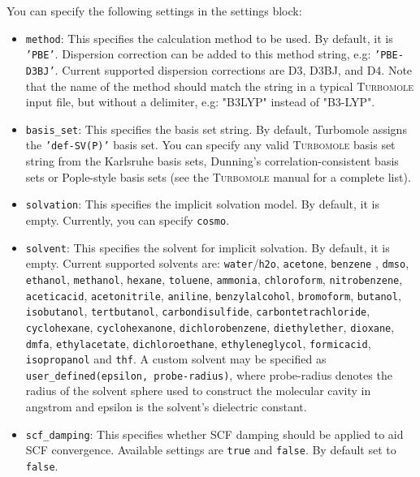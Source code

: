 \documentclass[]{tufte-book}
\begin{document}
You can specify the following settings in the settings block:
\begin{itemize}
\item \texttt{method}:
This specifies the calculation method to be used. By default, it is \texttt{'PBE'}. Dispersion correction can be added to this method string, e.g: \texttt{'PBE-D3BJ'}. Current supported dispersion corrections are D3\cite{grimmeD3}, D3BJ\cite{bjDamping}, and D4\cite{d4Damping}.
Note that the name of the method should match the string in a typical \textsc{Turbomole} input file, but without a delimiter, e.g: "B3LYP" instead of "B3-LYP".
\item \texttt{basis\_set}: This specifies the basis set string. By default, Turbomole assigns the \texttt{'def-SV(P)'} basis set. You can specify any valid \textsc{Turbomole} basis set string from the Karlsruhe basis sets\cite{karlsruheBasisSets}, Dunning's correlation-consistent basis sets\cite{dunningBasisSets} or Pople-style basis sets\cite{popleBasisSets} (see the \textsc{Turbomole} manual for a complete list).
\item \texttt{solvation}: This specifies the implicit solvation model. By default, it is empty. Currently, you can specify \texttt{cosmo}.
\item \texttt{solvent}: This specifies the solvent for implicit solvation. By default, it is empty. Current supported solvents are: \texttt{water}/\texttt{h2o}, \texttt{acetone}, \texttt{benzene}
, \texttt{dmso}, \texttt{ethanol}, \texttt{methanol}, \texttt{hexane}, \texttt{toluene}, \texttt{ammonia}, \texttt{chloroform}, \texttt{nitrobenzene}, \texttt{aceticacid}, \texttt{acetonitrile}, \texttt{aniline}, \texttt{benzylalcohol}, \texttt{bromoform}, \texttt{butanol}, \texttt{isobutanol}, \texttt{tertbutanol}, \texttt{carbondisulfide}, \texttt{carbontetrachloride}, \texttt{cyclohexane}, \texttt{cyclohexanone}, \texttt{dichlorobenzene}, \texttt{diethylether}, \texttt{dioxane}, \texttt{dmfa}, \texttt{ethylacetate}, \texttt{dichloroethane}, \texttt{ethyleneglycol}, \texttt{formicacid}, \texttt{isopropanol} and \texttt{thf}. A custom solvent may be specified as \texttt{user\_defined(epsilon, probe-radius)}, where probe-radius denotes the radius of the solvent sphere used to construct the molecular cavity in angstrom and epsilon is the solvent's dielectric constant.
\item \texttt{scf\_damping}: This specifies whether SCF damping should be applied to aid SCF convergence. Available settings are \texttt{true} and \texttt{false}. By default set to \texttt{false}.

\end{itemize}
\end{document}
